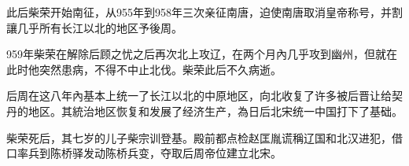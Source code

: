 此后柴荣开始南征，从955年到958年三次亲征南唐，迫使南唐取消皇帝称号，并割讓几乎所有长江以北的地区予後周。

959年柴荣在解除后顾之忧之后再次北上攻辽，在两个月內几乎攻到幽州，但就在此时他突然患病，不得不中止北伐。柴荣此后不久病逝。

后周在这八年內基本上统一了长江以北的中原地区，向北收复了许多被后晋让给契丹的地区。其統治地区恢复和发展了经济生产，為日后北宋统一中国打下了基础。

柴荣死后，其七岁的儿子柴宗训登基。殿前都点检赵匡胤谎稱辽国和北汉进犯，借口率兵到陈桥驿发动陈桥兵变，夺取后周帝位建立北宋。






